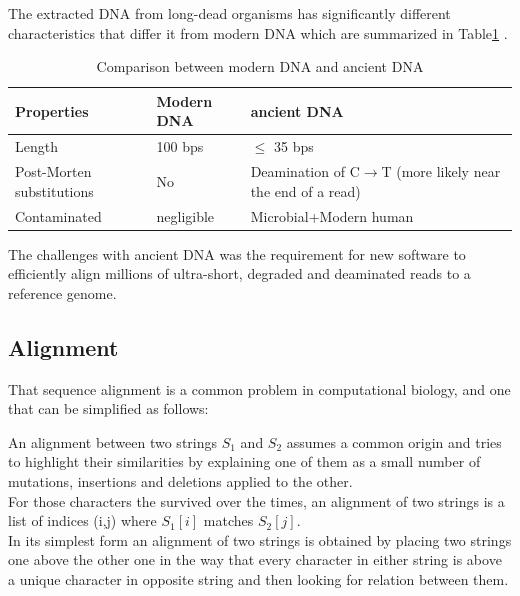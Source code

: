 \documentclass[11pt,a4paper]{report}
\begin{document}
The extracted DNA from long-dead organisms has significantly different characteristics
 that differ it from modern DNA which are summarized in Table\ref{aDNAchar} .\\



\begin{table}[H]
  \begin{tabular}{ |  p{4cm} | p{2cm} | p{5cm} |}
    \hline
  \textbf{  Properties} & \textbf{Modern DNA } &\textbf{ ancient DNA} \\ \hline
       Length &  100 bps  & $\leq$  35 bps \\ \hline
       Post-Morten substitutions & No  & Deamination of C$\to$T
(more likely near the end of a read) \\ \hline
  Contaminated & negligible & Microbial+Modern human\\ \hline
    \end{tabular}
\caption{Comparison between modern DNA and ancient DNA}
\label{aDNAchar}
\end{table}


The challenges with ancient DNA was the requirement for new software to efficiently 
align millions of ultra-short, degraded and deaminated reads to a reference genome.


\subsection{Alignment} \label{Alignment}

That sequence alignment is a common problem in computational biology, 
and one that can be simplified as follows:

An alignment between two strings $S_{1}$ and $S_{2}$ assumes a common origin and 
tries to highlight their similarities by explaining one of them as a small number 
of mutations, insertions and deletions applied to the other.\\

For those characters the survived over the times, an alignment of two strings is 
a list of indices (i,j) where $S_{1}[i]$ matches $S_{2}[j]$.\\ 
In its simplest form an alignment of two strings is obtained by placing two strings
one above the other one in the way that every character in either string is above 
a unique character in opposite string and then looking for relation between them.\\\\
\end{document}
